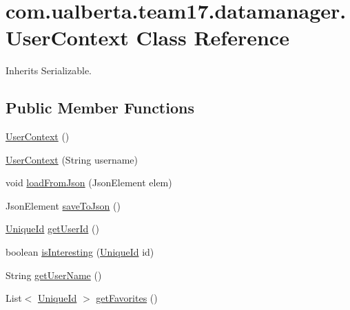 \hypertarget{classcom_1_1ualberta_1_1team17_1_1datamanager_1_1_user_context}{\section{com.\+ualberta.\+team17.\+datamanager.\+User\+Context Class Reference}
\label{classcom_1_1ualberta_1_1team17_1_1datamanager_1_1_user_context}
}


Inherits Serializable.

\subsection*{Public Member Functions}
\begin{DoxyCompactItemize}
\item 
\hyperlink{classcom_1_1ualberta_1_1team17_1_1datamanager_1_1_user_context_a46a8cbdc5ea412704d7cba043c3fb1e8}{User\+Context} ()
\item 
\hyperlink{classcom_1_1ualberta_1_1team17_1_1datamanager_1_1_user_context_a74083c0db7c16dd0b495cc9db6ffe2a7}{User\+Context} (String username)
\item 
void \hyperlink{classcom_1_1ualberta_1_1team17_1_1datamanager_1_1_user_context_a51b1fab07f64a7b0976311e8b6ae4311}{load\+From\+Json} (Json\+Element elem)
\item 
Json\+Element \hyperlink{classcom_1_1ualberta_1_1team17_1_1datamanager_1_1_user_context_ab218354ecbc3b136adf43b36525d62bc}{save\+To\+Json} ()
\item 
\hyperlink{classcom_1_1ualberta_1_1team17_1_1_unique_id}{Unique\+Id} \hyperlink{classcom_1_1ualberta_1_1team17_1_1datamanager_1_1_user_context_a2130f56086cbfb3682295759dbda9c52}{get\+User\+Id} ()
\item 
boolean \hyperlink{classcom_1_1ualberta_1_1team17_1_1datamanager_1_1_user_context_a5af39558040ada3195d4a33d4fbeb5c5}{is\+Interesting} (\hyperlink{classcom_1_1ualberta_1_1team17_1_1_unique_id}{Unique\+Id} id)
\item 
String \hyperlink{classcom_1_1ualberta_1_1team17_1_1datamanager_1_1_user_context_a8c2e497ebb83acad23be6496de037009}{get\+User\+Name} ()
\item 
List$<$ \hyperlink{classcom_1_1ualberta_1_1team17_1_1_unique_id}{Unique\+Id} $>$ \hyperlink{classcom_1_1ualberta_1_1team17_1_1datamanager_1_1_user_context_a78ba2b586b9eb6a682acf69201c0832c}{get\+Favorites} ()
\item 

\end{DoxyCompactItemize}
